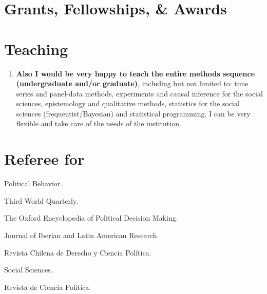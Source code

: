 \documentclass[letterpaper]{article}
\renewenvironment{itemize}{
  \begin{list}{}{
    \setlength{\leftmargin}{1.5em}
  }
}{
  \end{list}
}
\begin{document}
\section*{Grants, Fellowships, \& Awards}
{\unskip}



\section*{Teaching}

{\unskip}

\begin{enumerate}
\item[\Pointinghand]  {\bf Also I would be very happy to teach the entire methods sequence (undergraduate and/or graduate)}, including but not limited to: {\color{gray}time series and panel-data methods, experiments and causal inference for the social sciences, epistemology and qualitative methods, statistics for the social sciences (frequentist/Bayesian) and statistical programming}. I can be very flexible and take care of the needs of the institution.
\end{enumerate}


\section*{Referee for}
  \begin{itemize}
    \item[\textcolor{gray}{\textbullet}] Political Behavior.
    \item[\textcolor{gray}{\textbullet}] Third World Quarterly.
    \item[\textcolor{gray}{\textbullet}] The Oxford Encyclopedia of Political Decision Making.
    \item[\textcolor{gray}{\textbullet}] Journal of Iberian and Latin American Research.
    \item[\textcolor{gray}{\textbullet}] Revista Chilena de Derecho y Ciencia Pol\'itica.
    \item[\textcolor{gray}{\textbullet}] Social Sciences.
    \item[\textcolor{gray}{\textbullet}] Revista de Ciencia Pol\'itica.

  \end{itemize}
\end{document}
